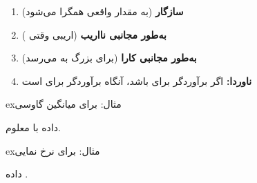 
\begin{enumerate}
\def\labelenumi{\arabic{enumi}.}
\tightlist
\item
  \textbf{سازگار} (به مقدار واقعی همگرا می‌شود)
\item
  \textbf{به‌طور مجانبی نااریب} (اریبی  وقتی )
\item
  \textbf{به‌طور مجانبی کارا} (برای  بزرگ به  می‌رسد)
\item
  \textbf{ناوردا:} اگر \lr{\ensuremath{\hat{\theta}}} برآوردگر  برای \lr{\ensuremath{\theta}} باشد، آنگاه  برآوردگر  برای  است
\end{enumerate}

\begin{PSbox}[unbreakable]{ex}{مثال:  برای میانگین گاوسی}

داده  با  معلوم.



\end{PSbox}

\begin{PSbox}[unbreakable]{ex}{مثال:  برای نرخ نمایی}

داده .



\end{PSbox}

